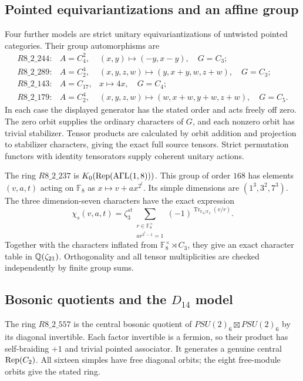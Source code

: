 \subsection{Pointed equivariantizations and an affine group}
Four further models are strict unitary equivariantizations of untwisted
pointed categories. Their group automorphisms are
\[
\begin{array}{lll}
R8\_2\_244:& A=C_4^2,&(x,y)\mapsto(-y,x-y),\quad G=C_3;\\
R8\_2\_289:& A=C_2^4,&(x,y,z,w)\mapsto(y,x+y,w,z+w),\quad G=C_3;\\
R8\_2\_143:& A=C_{17},&x\mapsto4x,\quad G=C_4;\\
R8\_2\_179:& A=C_2^4,&(x,y,z,w)\mapsto(w,x+w,y+w,z+w),\quad G=C_5.
\end{array}
\]
In each case the displayed generator has the stated order and acts
freely off zero. The zero orbit supplies the ordinary characters of
$G$, and each nonzero orbit has trivial stabilizer. Tensor products
are calculated by orbit addition and projection to stabilizer
characters, giving the exact full source tensors. Strict permutation
functors with identity tensorators supply coherent unitary actions.

The ring $R8\_2\_237$ is
$K_0(\operatorname{Rep}(\operatorname{A\Gamma L}(1,8)))$. This group of order
$168$ has elements $(v,a,t)$ acting on $\mathbb F_8$ as
$x\mapsto v+a x^{2^t}$. Its simple dimensions are $(1^3,3^2,7^3)$.
The three dimension-seven characters have the exact expression
\[
\chi_s(v,a,t)=\zeta_3^{st}
\sum_{\substack{r\in\mathbb F_8^\times\\ar^{2^t-1}=1}}
 (-1)^{\operatorname{Tr}_{\mathbb F_8/\mathbb F_2}(v/r)}.
\]
Together with the characters inflated from
$\mathbb F_8^\times\rtimes C_3$, they give an exact character table
in $\mathbb Q(\zeta_{21})$. Orthogonality and all tensor multiplicities are
checked independently by finite group sums.

\subsection{Bosonic quotients and the \texorpdfstring{$D_{14}$}{D14} model}
The ring $R8\_2\_557$ is the central bosonic quotient of
$PSU(2)_6\boxtimes PSU(2)_6$ by its diagonal invertible. Each factor
invertible is a fermion, so their product has self-braiding $+1$ and
trivial pointed associator. It generates a genuine central
$\operatorname{Rep}(C_2)$. All sixteen simples have free diagonal orbits; the eight
free-module orbits give the stated ring.

